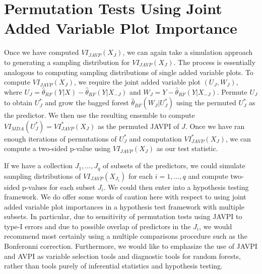 \documentclass[12pt,twoside]{reedthesis}
\theoremstyle{definition}
\theoremstyle{definition}
\theoremstyle{definition}
\theoremstyle{remark}
\begin{document}
\section{Permutation Tests Using Joint Added Variable Plot
Importance}\label{permutation-tests-using-joint-added-variable-plot-importance}

Once we have computed \(VI_{JAVP}(X_J)\), we can again take a simulation
approach to generating a sampling distribution for \(VI_{JAVP}(X_J)\).
The process is essentially analogous to computing sampling distributions
of single added variable plots. To compute \(VI_{JAVP}(X_J)\), we
require the joint added variable plot \((U_J,W_J)\), where
\(U_J=\hat{\theta}_{RF}(Y|X)-\hat{\theta}_{RF}(Y|X_{-J})\) and
\(W_J=Y-\hat{\theta}_{RF}(Y|X_{-J})\). Permute \(U_J\) to obtain
\(U_J^*\) and grow the bagged forest \(\hat{\theta}_{BF}(W_J|U_J^*)\)
using the permuted \(U_J^*\) as the predictor. We then use the resulting
ensemble to compute \(VI_{MDA}(U_J^*)=VI_{JAVP}^*(X_J)\) as the permuted
JAVPI of \(J\). Once we have ran enough iterations of permutations of
\(U_J^*\) and computation \(VI_{JAVP}^*(X_J)\), we can compute a
two-sided p-value using \(VI_{JAVP}(X_J)\) as our test statistic. \par

If we have a collection \(J_1,\ldots, J_q\) of subsets of the
predictors, we could simulate sampling distributions of
\(VI_{JAVP}(X_{J_i})\) for each \(i=1,\ldots,q\) and compute two-sided
p-values for each subset \(J_i\). We could then enter into a hypothesis
testing framework. We do offer some words of caution here with respect
to using joint added variable plot importances in a hypothesis test
framework with multiple subsets. In particular, due to sensitivity of
permutation tests using JAVPI to type-I errors and due to possible
overlap of predictors in the \(J_i\), we would recommend most certainly
using a multiple comparisons procedure such as the Bonferonni
correction. Furthermore, we would like to emphasize the use of JAVPI and
AVPI as variable selection tools and diagnostic tools for random
forests, rather than tools purely of inferential statistics and
hypothesis testing. \par
\end{document}
